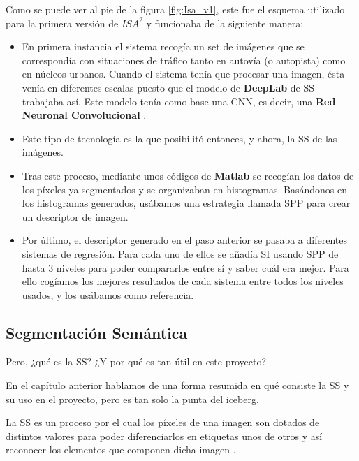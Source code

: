 Como se puede ver al pie de la figura \ref{fig:Isa_v1}, este fue el esquema utilizado para la primera versión de $ISA^{2}$ \cite{isa2} y funcionaba de la siguiente manera:


\begin{itemize}
\item En primera instancia el sistema recogía un set de imágenes que se correspondía con situaciones de tráfico tanto en autovía (o autopista) como en núcleos urbanos. Cuando el sistema tenía que procesar una imagen, ésta venía en diferentes escalas puesto que el modelo de \textbf{DeepLab} de \ac{SS} trabajaba así. Este modelo tenía como base una \ac{CNN}, es decir, una \textbf{Red Neuronal Convolucional} \cite{cnn}.
 
\item Este tipo de tecnología es la que posibilitó entonces, y ahora, la \ac{SS} de las imágenes.

\item Tras este proceso, mediante unos códigos de \textbf{Matlab} se recogían los datos de los píxeles ya segmentados y se organizaban en histogramas. Basándonos en los histogramas generados, usábamos una estrategia llamada \ac{SPP} \cite{spp} para crear un descriptor de imagen.

\item Por último, el descriptor generado en el paso anterior se pasaba a diferentes sistemas de regresión. Para cada uno de ellos se añadía \ac{SI} \cite{spp} usando \ac{SPP} de hasta 3 niveles para poder compararlos entre sí y saber cuál era mejor. Para ello cogíamos los mejores resultados de cada sistema entre todos los niveles usados, y los usábamos como referencia.

\end{itemize}

\subsection{Segmentación Semántica}

Pero, ¿qué es la \ac{SS}? ¿Y por qué es tan útil en este proyecto?

En el capítulo anterior hablamos de una forma resumida en qué consiste la \ac{SS} y su uso en el proyecto, pero es tan solo la punta del iceberg.


La \ac{SS} es un proceso por el cual los píxeles de una imagen son dotados de distintos valores para poder diferenciarlos en etiquetas unos de otros y así reconocer los elementos que componen dicha imagen \cite{deeplab}. 

